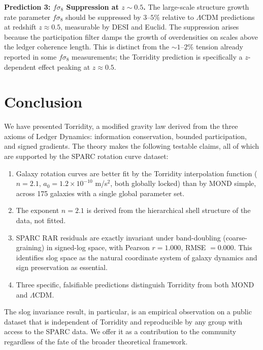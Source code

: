 \documentclass[aps,prl,twocolumn,superscriptaddress,nofootinbib]{revtex4-2}
\begin{document}
\textbf{Prediction 3: $f\sigma_8$ Suppression at $z \sim 0.5$.}
The large-scale structure growth rate parameter $f\sigma_8$ should be suppressed by $3$--$5\%$ relative to $\Lambda$CDM predictions at redshift $z \approx 0.5$, measurable by DESI and Euclid. The suppression arises because the participation filter damps the growth of overdensities on scales above the ledger coherence length. This is distinct from the $\sim$$1$--$2\%$ tension already reported in some $f\sigma_8$ measurements; the Torridity prediction is specifically a $z$-dependent effect peaking at $z \approx 0.5$.

\section{Conclusion}
\label{sec:conclusion}

We have presented Torridity, a modified gravity law derived from the three axioms of Ledger Dynamics: information conservation, bounded participation, and signed gradients. The theory makes the following testable claims, all of which are supported by the SPARC rotation curve dataset:

\begin{enumerate}
    \item Galaxy rotation curves are better fit by the Torridity interpolation function ($n = 2.1$, $a_0 = 1.2 \times 10^{-10}$ m/s$^2$, both globally locked) than by MOND simple, across 175 galaxies with a single global parameter set.

    \item The exponent $n = 2.1$ is derived from the hierarchical shell structure of the data, not fitted.

    \item SPARC RAR residuals are exactly invariant under band-doubling (coarse-graining) in signed-log space, with Pearson $r = 1.000$, RMSE $= 0.000$. This identifies slog space as the natural coordinate system of galaxy dynamics and sign preservation as essential.

    \item Three specific, falsifiable predictions distinguish Torridity from both MOND and $\Lambda$CDM.
\end{enumerate}

The slog invariance result, in particular, is an empirical observation on a public dataset that is independent of Torridity and reproducible by any group with access to the SPARC data. We offer it as a contribution to the community regardless of the fate of the broader theoretical framework.
\end{document}
